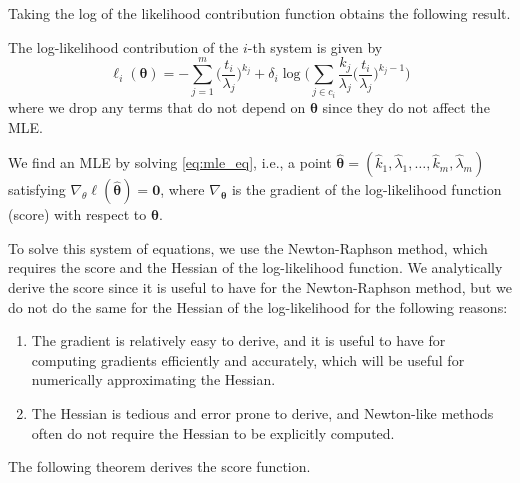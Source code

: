 \documentclass[
]{article}
\begin{document}
Taking the log of the likelihood contribution function obtains the
following result.

\begin{corollary}
The log-likelihood contribution of the $i$-th system is given by
\begin{equation}
\label{eq:weibull_log_likelihood_contribution}
\ell_i(\boldsymbol{\theta}) =
-\sum_{j=1}^{m}\biggl(\frac{t_i}{\lambda_j}\biggr)^{k_j} +
    \delta_i \log \!\Biggl(    
        \sum_{j \in c_i} \frac{k_j}{\lambda_j}\biggl(\frac{t_i}{\lambda_j}\biggr)^{k_j-1}
    \Biggr)
\end{equation}
where we drop any terms that do not depend on $\boldsymbol{\theta}$ since they do not
affect the MLE.
\end{corollary}

We find an MLE by solving \eqref{eq:mle_eq}, i.e., a point
\(\boldsymbol{\hat\theta} = (\hat{k}_1,\hat{\lambda}_1,\ldots,\hat{k}_m,\hat{\lambda}_m)\)
satisfying
\(\nabla_{\theta} \ell(\boldsymbol{\hat\theta}) = \boldsymbol{0}\),
where \(\nabla_{\boldsymbol{\theta}}\) is the gradient of the
log-likelihood function (score) with respect to \(\boldsymbol{\theta}\).

To solve this system of equations, we use the Newton-Raphson method,
which requires the score and the Hessian of the log-likelihood function.
We analytically derive the score since it is useful to have for the
Newton-Raphson method, but we do not do the same for the Hessian of the
log-likelihood for the following reasons:

\begin{enumerate}
\def\labelenumi{\arabic{enumi}.}
\item
  The gradient is relatively easy to derive, and it is useful to have
  for computing gradients efficiently and accurately, which will be
  useful for numerically approximating the Hessian.
\item
  The Hessian is tedious and error prone to derive, and Newton-like
  methods often do not require the Hessian to be explicitly computed.
\end{enumerate}

The following theorem derives the score function.
\end{document}
